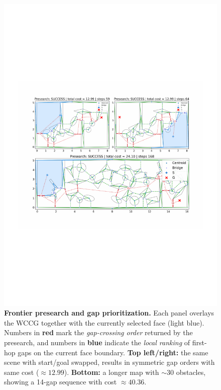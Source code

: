 \begin{figure}[t!]
  \centering
  \includegraphics[width=\linewidth]{figures/presearch.pdf}%
  \vspace{-0.2in}
  \caption{
  \textbf{Frontier presearch and gap prioritization.}
  Each panel overlays the WCCG together with the currently selected face (light blue).
  Numbers in \textbf{red} mark the \emph{gap-crossing order} returned by the presearch,
  and numbers in \textbf{blue} indicate the \emph{local ranking} of first-hop gaps on the current face boundary.
  \textbf{Top left/right:} the same scene with start/goal swapped, results in symmetric gap orders with same cost (\(\approx 12.99\)).
  \textbf{Bottom:} a longer map with \(\sim 30\) obstacles, showing a 14-gap sequence with cost \(\approx 40.36\).
  }
  \label{fig:overall}
  \vspace{-0.2in}
\end{figure}

